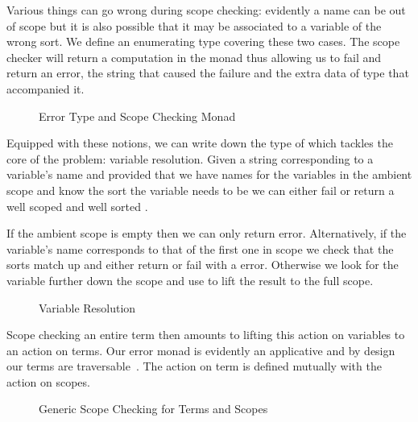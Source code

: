 Various things can go wrong during scope checking: evidently a name can
be out of scope but it is also possible that it may be associated to a
variable of the wrong sort. We define an enumerating type covering these
two cases. The scope checker will return a computation in the monad 
thus allowing us to fail and return an error, the string that caused the
failure and the extra data of type  that accompanied it.

\begin{figure}[h]
\begin{minipage}{0.5\textwidth}
\end{minipage}
\begin{minipage}{0.4\textwidth}
\end{minipage}
\caption{Error Type and Scope Checking Monad}
\end{figure}

Equipped with these notions, we can write down the type of 
which tackles the core of the problem: variable resolution. Given a string
corresponding to a variable's name and provided that we have names for the
variables in the ambient scope and know the sort the variable needs to be
we can either fail or return a well scoped and well sorted .

If the ambient scope is empty then we can only return  error.
Alternatively, if the variable's name corresponds to that of the first one
in scope we check that the sorts match up and either return  or fail
with a  error. Otherwise we look for the variable further
down the scope and use  to lift the result to the full scope.

\begin{figure}[h]
\caption{Variable Resolution}
\end{figure}

Scope checking an entire term then amounts to lifting this action on
variables to an action on terms. Our error monad  is evidently
an applicative and by design our terms are
traversable~\cite{bird_paterson_1999,DBLP:journals/jfp/GibbonsO09}.
The action on term is defined mutually with the action on scopes.

\begin{figure}[h]
\caption{Generic Scope Checking for Terms and Scopes}
\end{figure}
